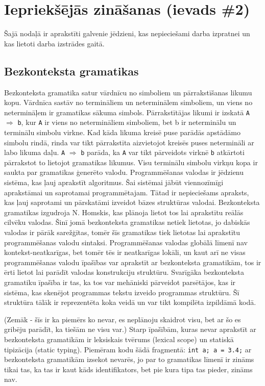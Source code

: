 \section{Iepriekšējās zināšanas (ievads \#2)}
Šajā nodaļā ir aprakstīti galvenie jēdzieni, kas nepieciešami darba izpratnei un kas lietoti darba izstrādes gaitā. 

\subsection{Bezkonteksta gramatikas}
Bezkonteksta gramatika satur vārdnīcu no simboliem un pārrakstīšanas likumu kopu. Vārdnīca sastāv no termināliem un neterminālem simboliem, un viens no netermināļem ir gramatikas sākuma simbols. Pārrakstītājas likumi ir izskatā \verb|A| $\Rightarrow$ \verb|b|, kur \verb|A| ir viens no netermināliem simboliem, bet b ir neterminālu un terminālu simbolu virkne. Kad kāda likuma kreisē puse parādās apstādāmo simbolu rindā, rinda var tikt pārrakstīta aizvietojot kreisēs puses netermināli ar labo likuma daļu. \verb|A| $\Rightarrow$ \verb|b| parāda, ka \verb|A| var tikt pārveidots virknē \verb|b| atkārtoti pārrakstot to lietojot gramatikas likumus. Visu terminālu simbolu virkņu kopa ir saukta par gramatikas ģenerēto valodu. \cite{Shutt:AdaptiveGrammars}
Programmēšanas valodas ir jēdzienu sistēma, kas ļauj aprakstīt algoritmus. Šai sistēmai jābūt viennozīmīgi aprakstāmai un saprotamai programmētajam. Tātad ir nepieciešams apraksts, kas ļauj saprotami un pārskatāmi izveidot bāzes struktūras valodai.
Bezkonteksta gramatikas izgudroja N. Homskis, kas plānoja lietot tos lai aprakstītu reālās cilvēku valodas. Šinī jomā bezkonteksta gramatikas netiek lietotas, jo dabiskās valodas ir pārāk sarežģītas, tomēr šīs gramatikas tiek lietotas lai aprakstītu programmēšanas valodu sintaksi. Programmēšanas valodas globālā līmenī nav kontekst-neatkarīgas, bet tomēr tēs ir neatkarīgas lokāli, un kaut arī ne visas programmēšanas valodu īpašības var aprakstīt ar bezkonteksta gramatikām, tos ir ērti lietot lai parādīt valodas konstrukciju struktūru.
Svarīgāka bezkonteksta gramatiku īpašība ir tas, ka tos var mehāniski pārveidot parsētājos, kas ir sistēma, kas skenējot programmas tekstu izveido programmas struktūru. Šī struktūra tālāk ir reprezentēta koka veidā un  var tikt kompilēta izpildāmā kodā. \cite{Hopcroft:IntroAutomataTheory}


(Zemāk - šīs ir ka piemērs ko nevar, es neplānoju skaidrot visu, bet ar šo es gribēju parādīt, ka tiešām ne visu var.)
Starp īpašībām, kuras nevar aprakstīt ar bezkonteksta gramatikām ir leksiskais tvērums (lexical scope) un statiskā tipizācija (static typing).
 Piemēram kodu šādā fragmentā: \verb|int a; a = 3.4;| ar bezkonteksta gramatikām izsekot nevarēs, jo par to gramatikas līmenī ir zināms tikai tas, ka tas ir kaut kāds identifikators, bet pie kura tipa tas pieder, zināms nav.

